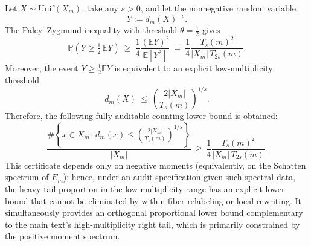 

\begin{theorem}\label{prop:fold-negative-moment-left-tail-certificate}
Let \(X\sim \mathrm{Unif}(X_m)\), take any \(s>0\), and let the nonnegative random variable
\[
Y:=d_m(X)^{-s}.
\]
The Paley--Zygmund inequality with threshold \(\theta=\tfrac12\) gives
\[
\mathbb P\!\left(Y\ge \tfrac12\,\mathbb EY\right)
\ \ge\
\frac{1}{4}\frac{(\mathbb EY)^2}{\mathbb E[Y^2]}
\ =\
\frac{1}{4}\frac{T_s(m)^2}{|X_m|\,T_{2s}(m)}.
\]
Moreover, the event \(Y\ge \tfrac12\mathbb EY\) is equivalent to an explicit low-multiplicity threshold
\[
d_m(X)\ \le\ \left(\frac{2|X_m|}{T_s(m)}\right)^{1/s}.
\]
Therefore, the following fully auditable counting lower bound is obtained:
\[
\boxed{
\frac{\#\left\{x\in X_m:\ d_m(x)\le \left(\frac{2|X_m|}{T_s(m)}\right)^{1/s}\right\}}{|X_m|}
\ \ge\
\frac{1}{4}\frac{T_s(m)^2}{|X_m|\,T_{2s}(m)}.
}
\]
This certificate depends only on negative moments (equivalently, on the Schatten spectrum of \(E_m\)); hence, under an audit specification given such spectral data, the heavy-tail proportion in the low-multiplicity range has an explicit lower bound that cannot be eliminated by within-fiber relabeling or local rewriting. It simultaneously provides an orthogonal proportional lower bound complementary to the main text's high-multiplicity right tail, which is primarily constrained by the positive moment spectrum.
\end{theorem}



